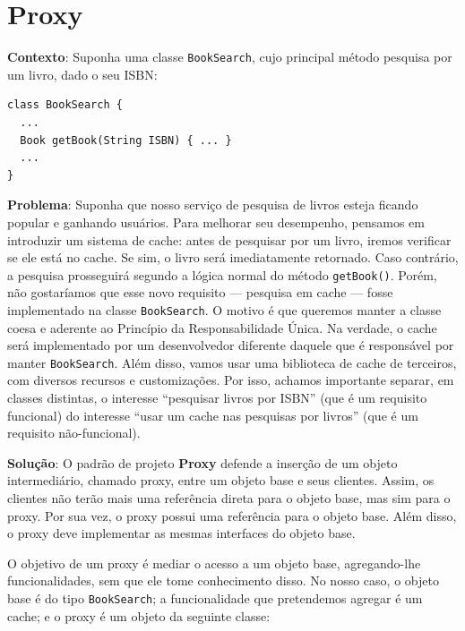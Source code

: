 \documentclass[
  11pt,
  twoside]{book}
\newcommand{\passthrough}[1]{#1}
\begin{document}
\hypertarget{proxy}{%
\section{Proxy}\label{proxy}}

 

\textbf{Contexto}: Suponha uma classe
\passthrough{\lstinline!BookSearch!}, cujo principal método pesquisa por
um livro, dado o seu ISBN:

\begin{lstlisting}
class BookSearch {
  ...
  Book getBook(String ISBN) { ... }
  ...
}
\end{lstlisting}

\textbf{Problema}: Suponha que nosso serviço de pesquisa de livros
esteja ficando popular e ganhando usuários. Para melhorar seu
desempenho, pensamos em introduzir um sistema de cache: antes de
pesquisar por um livro, iremos verificar se ele está no cache. Se sim, o
livro será imediatamente retornado. Caso contrário, a pesquisa
prosseguirá segundo a lógica normal do método
\passthrough{\lstinline!getBook()!}. Porém, não gostaríamos que esse
novo requisito --- pesquisa em cache --- fosse implementado na classe
\passthrough{\lstinline!BookSearch!}. O motivo é que queremos manter a
classe coesa e aderente ao Princípio da Responsabilidade Única. Na
verdade, o cache será implementado por um desenvolvedor diferente
daquele que é responsável por manter
\passthrough{\lstinline!BookSearch!}. Além disso, vamos usar uma
biblioteca de cache de terceiros, com diversos recursos e customizações.
Por isso, achamos importante separar, em classes distintas, o interesse
``pesquisar livros por ISBN'' (que é um requisito funcional) do
interesse ``usar um cache nas pesquisas por livros'' (que é um requisito
não-funcional).

\textbf{Solução}: O padrão de projeto \textbf{Proxy} defende a inserção
de um objeto intermediário, chamado proxy, entre um objeto base e seus
clientes. Assim, os clientes não terão mais uma referência direta para o
objeto base, mas sim para o proxy. Por sua vez, o proxy possui uma
referência para o objeto base. Além disso, o proxy deve implementar as
mesmas interfaces do objeto base.

O objetivo de um proxy é mediar o acesso a um objeto base, agregando-lhe
funcionalidades, sem que ele tome conhecimento disso. No nosso caso, o
objeto base é do tipo \passthrough{\lstinline!BookSearch!}; a
funcionalidade que pretendemos agregar é um cache; e o proxy é um objeto
da seguinte classe:
\end{document}
